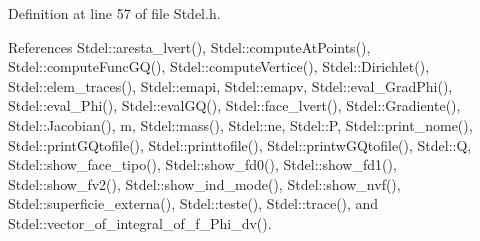 Definition at line 57 of file Stdel.\+h.



References Stdel\+::aresta\+\_\+lvert(), Stdel\+::compute\+At\+Points(), Stdel\+::compute\+Func\+G\+Q(), Stdel\+::compute\+Vertice(), Stdel\+::\+Dirichlet(), Stdel\+::elem\+\_\+traces(), Stdel\+::emapi, Stdel\+::emapv, Stdel\+::eval\+\_\+\+Grad\+Phi(), Stdel\+::eval\+\_\+\+Phi(), Stdel\+::eval\+G\+Q(), Stdel\+::face\+\_\+lvert(), Stdel\+::\+Gradiente(), Stdel\+::\+Jacobian(), m, Stdel\+::mass(), Stdel\+::ne, Stdel\+::P, Stdel\+::print\+\_\+nome(), Stdel\+::print\+G\+Qtofile(), Stdel\+::printtofile(), Stdel\+::printw\+G\+Qtofile(), Stdel\+::Q, Stdel\+::show\+\_\+face\+\_\+tipo(), Stdel\+::show\+\_\+fd0(), Stdel\+::show\+\_\+fd1(), Stdel\+::show\+\_\+fv2(), Stdel\+::show\+\_\+ind\+\_\+mode(), Stdel\+::show\+\_\+nvf(), Stdel\+::superficie\+\_\+externa(), Stdel\+::teste(), Stdel\+::trace(), and Stdel\+::vector\+\_\+of\+\_\+integral\+\_\+of\+\_\+f\+\_\+\+Phi\+\_\+dv().

